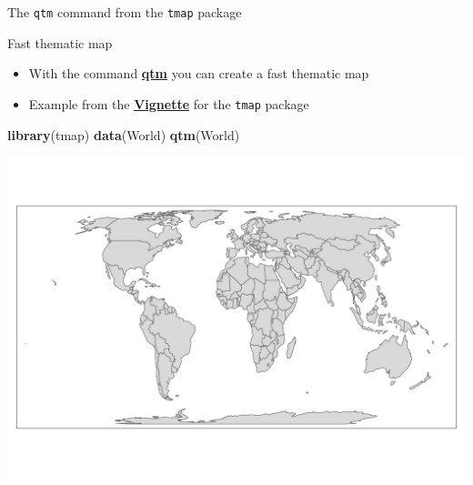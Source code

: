 \documentclass[
  ignorenonframetext,
]{beamer}
\newenvironment{Shaded}{\begin{snugshade}}{\end{snugshade}}
\newcommand{\KeywordTok}[1]{\textcolor[rgb]{0.13,0.29,0.53}{\textbf{#1}}}
\newcommand{\NormalTok}[1]{#1}
\begin{document}
\begin{frame}[fragile]{The \texttt{qtm} command from the \texttt{tmap}
package}
\protect\hypertarget{the-qtm-command-from-the-tmap-package}{}
\begin{block}{Fast thematic map}
\protect\hypertarget{fast-thematic-map}{}
\begin{itemize}
\item
  With the command
  \href{https://cran.r-project.org/web/packages/tmap/vignettes/tmap-nutshell.html}{\textbf{qtm}}
  you can create a fast thematic map
\item
  Example from the
  \href{https://cran.r-project.org/web/packages/tmap/vignettes/tmap-nutshell.html}{\textbf{Vignette}}
  for the \texttt{tmap} package
\end{itemize}

\begin{Shaded}
\begin{Highlighting}[]
\KeywordTok{library}\NormalTok{(tmap)}
\KeywordTok{data}\NormalTok{(World)}
\KeywordTok{qtm}\NormalTok{(World)}
\end{Highlighting}
\end{Shaded}

\includegraphics{quick_high_quality_maps_files/figure-beamer/unnamed-chunk-3-1.pdf}
\end{block}
\end{frame}
\end{document}
